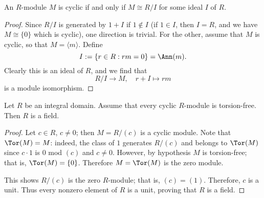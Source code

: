 \begin{proposition}
An $R$-module $M$ is cyclic if and only if $M\cong R/I$ for some ideal $I$ of $R$.
\end{proposition}
\begin{proof}
Since $R/I$ is generated by $1+I$ if $1\notin I$ (if $1\in I$, then $I=R$, and we have $M\cong\{0\}$ which is cyclic), one direction is trivial. For the other, assume that $M$ is cyclic, so that $M=\langle m\rangle$. Define 
\[I:=\{r\in R:rm=0\}=\Ann(m).\]
Clearly this is an ideal of $R$, and we find that 
\[R/I\to M,\quad r+I\mapsto rm\]
is a module isomorphism.
\end{proof}
\begin{lemma}\label{tor free field}
Let $R$ be an integral domain. Assume that every cyclic $R$-module is torsion-free. Then $R$ is a field.
\end{lemma}
\begin{proof}
Let $c\in R$, $c\neq0$; then $M=R/(c)$ is a cyclic module. Note that $\Tor(M)=M$: indeed, the class of $1$ generates $R/(c)$ and belongs to $\Tor(M)$ since $c\cdot1$ is $0$ mod $(c)$ and $c\neq0$. However, by hypothesis $M$ is torsion-free; that is, $\Tor(M)=\{0\}$. Therefore $M=\Tor(M)$ is the zero module.\par
This shows $R/(c)$ is the zero $R$-module; that is, $(c)=(1)$. Therefore, $c$ is a unit. Thus every nonzero element of $R$ is a unit, proving that $R$ is a field.
\end{proof}

